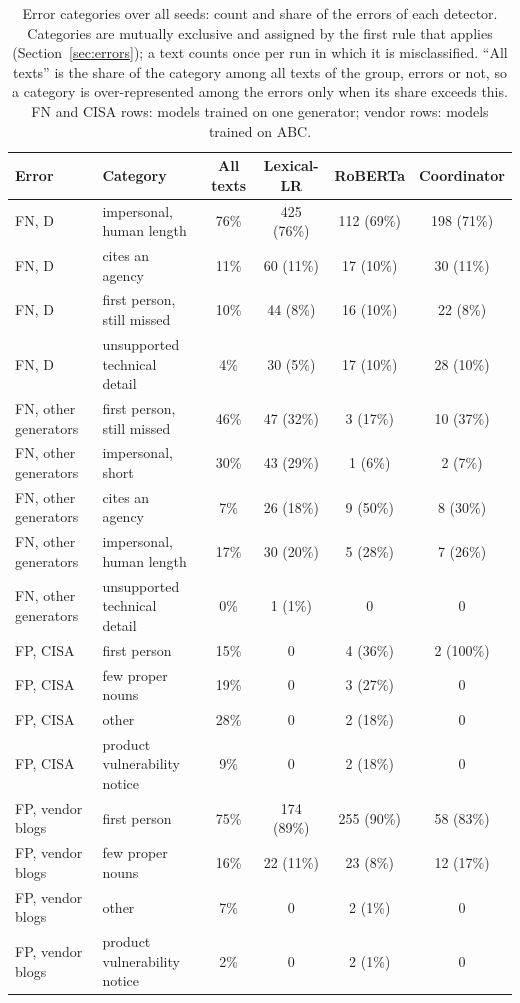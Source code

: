 \begin{table}[t]
\centering
\footnotesize
\caption{Error categories over all seeds: count and share of the errors of each detector. Categories are mutually exclusive and assigned by the first rule that applies (Section~\ref{sec:errors}); a text counts once per run in which it is misclassified. ``All texts'' is the share of the category among all texts of the group, errors or not, so a category is over-represented among the errors only when its share exceeds this. FN and CISA rows: models trained on one generator; vendor rows: models trained on ABC.}
\label{tab:errors}
\begin{tabular}{llcccc}
\toprule
Error & Category & All texts & Lexical-LR & RoBERTa & Coordinator \\
\midrule
FN, D & impersonal, human length & 76\% & 425 (76\%) & 112 (69\%) & 198 (71\%) \\
FN, D & cites an agency & 11\% & 60 (11\%) & 17 (10\%) & 30 (11\%) \\
FN, D & first person, still missed & 10\% & 44 (8\%) & 16 (10\%) & 22 (8\%) \\
FN, D & unsupported technical detail & 4\% & 30 (5\%) & 17 (10\%) & 28 (10\%) \\
FN, other generators & first person, still missed & 46\% & 47 (32\%) & 3 (17\%) & 10 (37\%) \\
FN, other generators & impersonal, short & 30\% & 43 (29\%) & 1 (6\%) & 2 (7\%) \\
FN, other generators & cites an agency & 7\% & 26 (18\%) & 9 (50\%) & 8 (30\%) \\
FN, other generators & impersonal, human length & 17\% & 30 (20\%) & 5 (28\%) & 7 (26\%) \\
FN, other generators & unsupported technical detail & 0\% & 1 (1\%) & 0 & 0 \\
FP, CISA & first person & 15\% & 0 & 4 (36\%) & 2 (100\%) \\
FP, CISA & few proper nouns & 19\% & 0 & 3 (27\%) & 0 \\
FP, CISA & other & 28\% & 0 & 2 (18\%) & 0 \\
FP, CISA & product vulnerability notice & 9\% & 0 & 2 (18\%) & 0 \\
FP, vendor blogs & first person & 75\% & 174 (89\%) & 255 (90\%) & 58 (83\%) \\
FP, vendor blogs & few proper nouns & 16\% & 22 (11\%) & 23 (8\%) & 12 (17\%) \\
FP, vendor blogs & other & 7\% & 0 & 2 (1\%) & 0 \\
FP, vendor blogs & product vulnerability notice & 2\% & 0 & 2 (1\%) & 0 \\
\bottomrule
\end{tabular}
\end{table}
